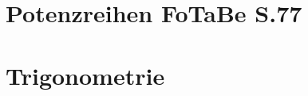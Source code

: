 \documentclass[8pt]{mpscheatsheet}
\begin{document}
    \section{Potenzreihen \texorpdfstring{\hfill FoTaBe S.77}{ - FoTaBe S.77}}
        
        
        
        \vfill \null \columnbreak
    \section{Trigonometrie}
        
        
        
\end{document}
